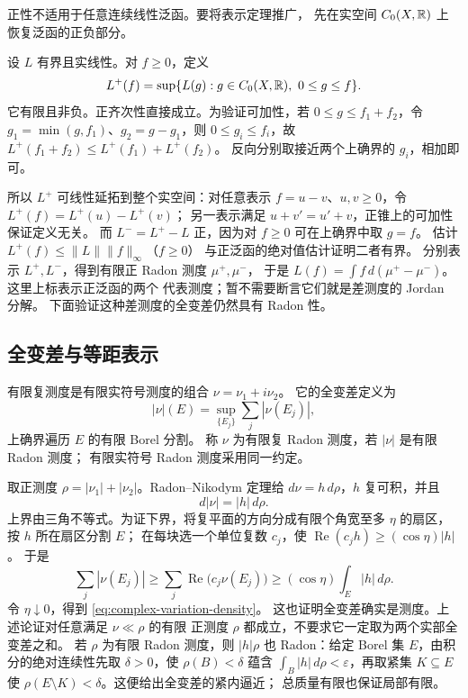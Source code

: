 正性不适用于任意连续线性泛函。要将表示定理推广，
先在实空间 \(C_0(X,\mathbb{R})\) 上恢复泛函的正负部分。

设 \(L\) 有界且实线性。对 \(f\ge0\)，定义
\[
 L^+(f)=\sup\{L(g):g\in C_0(X,\mathbb{R}),\ 0\le g\le f\}.
\]
它有限且非负。正齐次性直接成立。为验证可加性，若
\(0\le g\le f_1+f_2\)，令
\(g_1=\min(g,f_1)\)、\(g_2=g-g_1\)，则
\(0\le g_i\le f_i\)，故
\(L^+(f_1+f_2)\le L^+(f_1)+L^+(f_2)\)。
反向分别取接近两个上确界的 \(g_i\)，相加即可。

所以 \(L^+\) 可线性延拓到整个实空间：对任意表示
\(f=u-v\)、\(u,v\ge0\)，令 \(L^+(f)=L^+(u)-L^+(v)\)；
另一表示满足 \(u+v'=u'+v\)，正锥上的可加性保证定义无关。
而 \(L^-=L^+-L\) 正，因为对 \(f\ge0\) 可在上确界中取 \(g=f\)。
估计 \(L^+(f)\le\|L\|\|f\|_\infty\)（\(f\ge0\)）
与正泛函的绝对值估计证明二者有界。
分别表示 \(L^+,L^-\)，得到有限正 Radon 测度 \(\mu^+,\mu^-\)，
于是 \(L(f)=\int f\,d(\mu^+-\mu^-)\)。这里上标表示正泛函的两个
代表测度；暂不需要断言它们就是差测度的 Jordan 分解。
下面验证这种差测度的全变差仍然具有 Radon 性。

\subsection{全变差与等距表示}

有限复测度是有限实符号测度的组合 \(\nu=\nu_1+i\nu_2\)。
它的全变差定义为
\[
 |\nu|(E)=\sup_{\{E_j\}}\sum_j|\nu(E_j)|,
\]
上确界遍历 \(E\) 的有限 Borel 分割。
称 \(\nu\) 为有限复 Radon 测度，若 \(|\nu|\) 是有限 Radon 测度；
有限实符号 Radon 测度采用同一约定。

取正测度 \(\rho=|\nu_1|+|\nu_2|\)。Radon--Nikodym 定理给
\(d\nu=h\,d\rho\)，\(h\) 复可积，并且
\begin{equation}\label{eq:complex-variation-density}
 d|\nu|=|h|\,d\rho.
\end{equation}
上界由三角不等式。为证下界，将复平面的方向分成有限个角宽至多
\(\eta\) 的扇区，按 \(h\) 所在扇区分割 \(E\)；
在每块选一个单位复数 \(c_j\)，使
\(\operatorname{Re}(c_jh)\ge(\cos\eta)|h|\)。
于是
\[
 \sum_j|\nu(E_j)|
 \ge\sum_j\operatorname{Re}\bigl(c_j\nu(E_j)\bigr)
 \ge(\cos\eta)\int_E|h|\,d\rho.
\]
令 \(\eta\downarrow0\)，得到 \eqref{eq:complex-variation-density}。
这也证明全变差确实是测度。上述论证对任意满足 \(\nu\ll\rho\) 的有限
正测度 \(\rho\) 都成立，不要求它一定取为两个实部全变差之和。
若 \(\rho\) 为有限 Radon 测度，则 \(|h|\rho\) 也 Radon：给定 Borel
集 \(E\)，由积分的绝对连续性先取 \(\delta>0\)，使 \(\rho(B)<\delta\)
蕴含 \(\int_B|h|\,d\rho<\varepsilon\)，再取紧集 \(K\subseteq E\)
使 \(\rho(E\setminus K)<\delta\)。这便给出全变差的紧内逼近；
总质量有限也保证局部有限。

